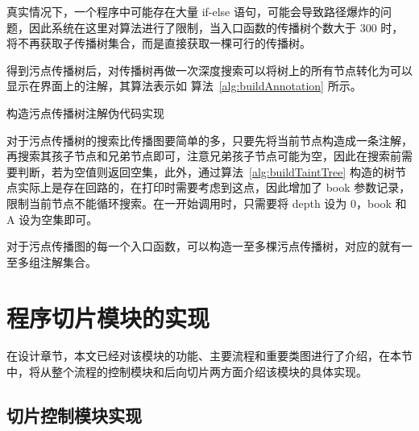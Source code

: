 真实情况下，一个程序中可能存在大量 if-else 语句，可能会导致路径爆炸的问题，因此系统在这里对算法进行了限制，当入口函数的传播树个数大于 300 时，将不再获取子传播树集合，而是直接获取一棵可行的传播树。

得到污点传播树后，对传播树再做一次深度搜索可以将树上的所有节点转化为可以显示在界面上的注解，其算法表示如 算法~\ref{alg:buildAnnotation} 所示。

\begin{algorithm}[!htb]\footnotesize
    \caption{构造污点传播树注解伪代码实现}
    \label{alg:buildAnnotation}
\end{algorithm}

对于污点传播树的搜索比传播图要简单的多，只要先将当前节点构造成一条注解，再搜索其孩子节点和兄弟节点即可，注意兄弟孩子节点可能为空，因此在搜索前需要判断，若为空值则返回空集，此外，通过算法~\ref{alg:buildTaintTree} 构造的树节点实际上是存在回路的，在打印时需要考虑到这点，因此增加了 book 参数记录，限制当前节点不能循环搜索。在一开始调用时，只需要将 depth 设为 0，book 和 A 设为空集即可。

对于污点传播图的每一个入口函数，可以构造一至多棵污点传播树，对应的就有一至多组注解集合。

\section{程序切片模块的实现}
在设计章节，本文已经对该模块的功能、主要流程和重要类图进行了介绍，在本节中，将从整个流程的控制模块和后向切片两方面介绍该模块的具体实现。\\

\subsection{切片控制模块实现}

